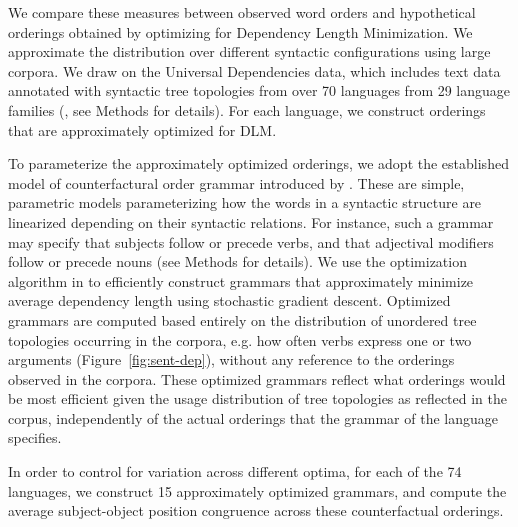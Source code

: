 \documentclass[11pt,a4paper]{article}
\newcommand\comment[1]{{\color{red}#1}}
\newcommand\mhahn[1]{{\color{red}(#1)}}
\begin{document}


We compare these measures between observed word orders and hypothetical orderings obtained by optimizing for Dependency Length Minimization. We approximate the distribution over different syntactic configurations using large corpora.
We draw on the Universal Dependencies data, which includes text data annotated with syntactic tree topologies from over 70 languages from 29 language families (\citep{zeman2020universal}, see Methods for details).
For each language, we construct orderings that are approximately optimized for DLM.

To parameterize the approximately optimized orderings, we adopt the established model of counterfactural order grammar introduced by \citet{gildea-optimizing-2007}.
These are simple, parametric models parameterizing how the words in a syntactic structure are linearized depending on their syntactic relations.
For instance, such a grammar may specify that subjects follow or precede verbs, and that adjectival modifiers follow or precede nouns (see Methods for details).
We use the optimization algorithm in \citet{hahn2020universals} to efficiently construct grammars that approximately minimize average dependency length using stochastic gradient descent.
Optimized grammars are computed based entirely on the distribution of unordered tree topologies occurring in the corpora, e.g. how often verbs express one or two arguments (Figure~\ref{fig:sent-dep}), without any reference to the orderings observed in the corpora.
These optimized grammars reflect what orderings would be most efficient given the usage distribution of tree topologies as reflected in the corpus, independently of the actual orderings that the grammar of the language specifies.

In order to control for variation across different optima, for each of the 74 languages, we construct 15 approximately optimized grammars, and compute the average subject-object position congruence across these counterfactual orderings.

\end{document}
